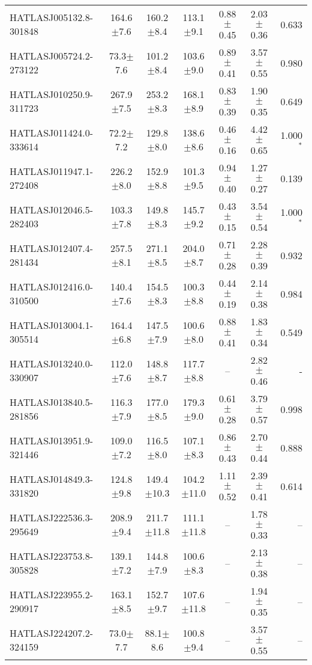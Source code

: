 \begin{landscape}
\begin{longtable}[h!]{lcccccr}
    HATLASJ005132.8-301848 & 164.6$\pm$7.6 & 160.2$\pm$8.4 & 113.1$\pm$9.1 & 0.88$\pm$0.45 & 2.03$\pm$0.36 & 0.633 \\
    HATLASJ005724.2-273122 & 73.3$\pm$7.6 & 101.2$\pm$8.4 & 103.6$\pm$9.0 & 0.89$\pm$0.41 & 3.57$\pm$0.55 & 0.980 \\
    HATLASJ010250.9-311723 & 267.9$\pm$7.5 & 253.2$\pm$8.3 & 168.1$\pm$8.9 & 0.83$\pm$0.39 & 1.90$\pm$0.35 & 0.649 \\
    HATLASJ011424.0-333614 & 72.2$\pm$7.2 & 129.8$\pm$8.0 & 138.6$\pm$8.6 & 0.46$\pm$0.16 & 4.42$\pm$0.65 & 1.000$^{\ast}$ \\
    HATLASJ011947.1-272408 & 226.2$\pm$8.0 & 152.9$\pm$8.8 & 101.3$\pm$9.5 & 0.94$\pm$0.40 & 1.27$\pm$0.27 & 0.139 \\
    HATLASJ012046.5-282403 & 103.3$\pm$7.8 & 149.8$\pm$8.3 & 145.7$\pm$9.2 & 0.43$\pm$0.15 & 3.54$\pm$0.54 & 1.000$^{\ast}$ \\
    HATLASJ012407.4-281434 & 257.5$\pm$8.1 & 271.1$\pm$8.5 & 204.0$\pm$8.7 & 0.71$\pm$0.28 & 2.28$\pm$0.39 & 0.932 \\
    HATLASJ012416.0-310500 & 140.4$\pm$7.6 & 154.5$\pm$8.3 & 100.3$\pm$8.8 & 0.44$\pm$0.19 & 2.14$\pm$0.38 & 0.984 \\
    HATLASJ013004.1-305514 & 164.4$\pm$6.8 & 147.5$\pm$7.9 & 100.6$\pm$8.0 & 0.88$\pm$0.41 & 1.83$\pm$0.34 & 0.549 \\
    HATLASJ013240.0-330907 & 112.0$\pm$7.6 & 148.8$\pm$8.7 & 117.7$\pm$8.8 & -- & 2.82$\pm$0.46 & - \\
    HATLASJ013840.5-281856 & 116.3$\pm$7.9 & 177.0$\pm$8.5 & 179.3$\pm$9.0 & 0.61$\pm$0.28 & 3.79$\pm$0.57 & 0.998 \\
    HATLASJ013951.9-321446 & 109.0$\pm$7.2 & 116.5$\pm$8.0 & 107.1$\pm$8.3 & 0.86$\pm$0.43 & 2.70$\pm$0.44 & 0.888 \\
    HATLASJ014849.3-331820 & 124.8$\pm$9.8 & 149.4$\pm$10.3 & 104.2$\pm$11.0 & 1.11$\pm$0.52 & 2.39$\pm$0.41 & 0.614 \\
    HATLASJ222536.3-295649 & 208.9$\pm$9.4 & 211.7$\pm$11.8 & 111.1$\pm$11.8 & -- & 1.78$\pm$0.33 & -- \\
    HATLASJ223753.8-305828 & 139.1$\pm$7.2 & 144.8$\pm$7.9 & 100.6$\pm$8.3 & -- & 2.13$\pm$0.38 & -- \\
    HATLASJ223955.2-290917 & 163.1$\pm$8.5 & 152.7$\pm$9.7 & 107.6$\pm$11.8 & -- & 1.94$\pm$0.35 & -- \\
    HATLASJ224207.2-324159 & 73.0$\pm$7.7 & 88.1$\pm$8.6 & 100.8$\pm$9.4 & -- & 3.57$\pm$0.55 & -- \\

\end{longtable}
\end{landscape}
